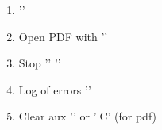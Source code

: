 \documentclass{minimal}
\begin{document}
\begin{enumerate}
	\item '\ll'
	\item Open PDF with '\lv'
	\item Stop '\ll' '\lk'
	\item Log of errors '\le'
	\item Clear aux '\lc' or 'lC' (for pdf)
\end{enumerate}
\end{document}
